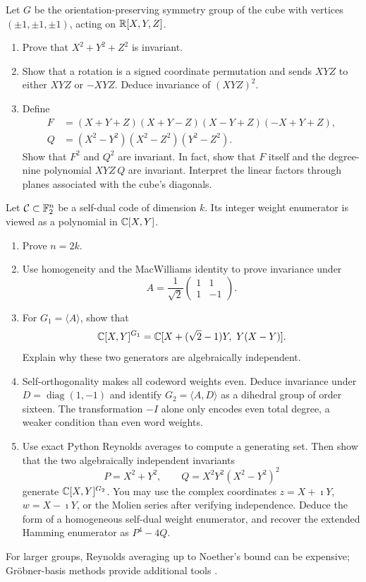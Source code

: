 \begin{exo}
\label{exo-ring-invariants}
Let $G$ be the orientation-preserving symmetry group of the cube with
vertices $(\pm1,\pm1,\pm1)$, acting on $\mathbb{R}[X,Y,Z]$.
\begin{enumerate}
\item Prove that $X^2+Y^2+Z^2$ is invariant.
\item Show that a rotation is a signed coordinate permutation and sends
$XYZ$ to either $XYZ$ or $-XYZ$. Deduce invariance of $(XYZ)^2$.
\item Define
\[
 \begin{aligned}
 F&=(X+Y+Z)(X+Y-Z)(X-Y+Z)(-X+Y+Z),\\
 Q&=(X^2-Y^2)(X^2-Z^2)(Y^2-Z^2).
 \end{aligned}
\]
Show that $F^2$ and $Q^2$ are invariant. In fact, show that $F$ itself
and the degree-nine polynomial $XYZ\,Q$ are invariant. Interpret the
linear factors through planes associated with the cube's diagonals.
\end{enumerate}
\end{exo}


\begin{exo}
\label{exo-codes-autoduaux}
Let $\mathcal{C}\subset\mathbb{F}_2^n$ be a self-dual code of dimension $k$. Its
integer weight enumerator is viewed as a polynomial in $\mathbb{C}[X,Y]$.
\begin{enumerate}
\item Prove $n=2k$.
\item Use homogeneity and the MacWilliams identity to prove invariance
under
\[
 A=\frac1{\sqrt2}\begin{pmatrix}1&1\\1&-1\end{pmatrix}.
\]
\item For $G_1=\langle A\rangle$, show that
\[
 \CC[X,Y]^{G_1}=\CC[X+(\sqrt2-1)Y,\ Y(X-Y)].
\]
Explain why these two generators are algebraically independent.
\item Self-orthogonality makes all codeword weights even. Deduce invariance
under $D=\operatorname{diag}(1,-1)$ and identify
$G_2=\langle A,D\rangle$ as a dihedral group of order sixteen.
The transformation $-I$ alone only encodes even total degree, a weaker
condition than even word weights.
\item Use exact Python Reynolds averages to compute a generating set.
Then show that the two algebraically independent invariants
\[
 P=X^2+Y^2,\qquad Q=X^2Y^2(X^2-Y^2)^2
\]
generate $\mathbb{C}[X,Y]^{G_2}$. You may use the complex coordinates
$z=X+\imath Y$, $w=X-\imath Y$, or the Molien series after verifying
independence. Deduce the form of a homogeneous self-dual weight enumerator,
and recover the extended Hamming enumerator as $P^4-4Q$.
\end{enumerate}
For larger groups, Reynolds averaging up to Noether's bound can be expensive;
Gr\"obner-basis methods provide additional tools \cite{cox}.
\end{exo}


